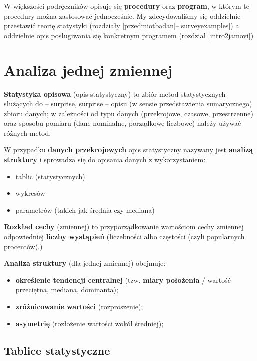 \documentclass[
  openany]{book}
\begin{document}
W większości podręczników opisuje się \textbf{procedury}
oraz \textbf{program}, w którym te procedury można zastosować jednocześnie.
My zdecydowaliśmy się oddzielnie przestawić teorię
statystyki (rozdziały \ref{przedmiotbadan}--\ref{surveyexamples})
a oddzielnie opis posługiwania się konkretnym programem (rozdział \ref{intro2jamovi})

\hypertarget{analiza1z}{%
\chapter{Analiza jednej zmiennej}\label{analiza1z}}

\textbf{Statystyka opisowa} (opis statystyczny) to zbiór metod statystycznych służących do -- surprise, surprise -- opisu
(w sensie przedstawienia sumarycznego) zbioru danych;
w zależności od typu danych (przekrojowe, czasowe, przestrzenne) oraz sposobu pomiaru
(dane nominalne, porządkowe liczbowe) należy używać różnych metod.

W przypadku \textbf{danych przekrojowych} opis statystyczny nazywany jest \textbf{analizą struktury}
i sprowadza się do opisania danych z wykorzystaniem:

\begin{itemize}
\item
  tablic (statystycznych)
\item
  wykresów
\item
  parametrów (takich jak średnia czy mediana)
\end{itemize}

\textbf{Rozkład cechy} (zmiennej) to przyporządkowanie
wartościom cechy zmiennej odpowiedniej \textbf{liczby wystąpień} (liczebności albo częstości
(czyli popularnych procentów).)

\textbf{Analiza struktury} (dla jednej zmiennej) obejmuje:

\begin{itemize}
\item
  \textbf{określenie tendencji centralnej} (tzw. \textbf{miary położenia} / wartość przeciętna, mediana, dominanta);
\item
  \textbf{zróżnicowanie wartości} (rozproszenie);
\item
  \textbf{asymetrię} (rozłożenie wartości wokół średniej);
\end{itemize}

\hypertarget{tablice-statystyczne}{%
\section{Tablice statystyczne}\label{tablice-statystyczne}}
\end{document}
